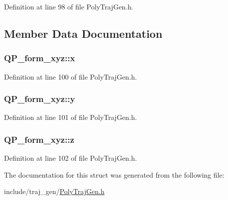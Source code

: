 Definition at line 98 of file Poly\+Traj\+Gen.\+h.



\subsection{Member Data Documentation}
\subsubsection[{\texorpdfstring{x}{x}}]{ Q\+P\+\_\+form\+\_\+xyz\+::x}\hypertarget{struct_q_p__form__xyz_a3a6e7a104ef31fda66007013ba3741f8}{}\label{struct_q_p__form__xyz_a3a6e7a104ef31fda66007013ba3741f8}


Definition at line 100 of file Poly\+Traj\+Gen.\+h.

\subsubsection[{\texorpdfstring{y}{y}}]{ Q\+P\+\_\+form\+\_\+xyz\+::y}\hypertarget{struct_q_p__form__xyz_a3e1c8fbfd5a4650fb45fc0ca14c2bcb6}{}\label{struct_q_p__form__xyz_a3e1c8fbfd5a4650fb45fc0ca14c2bcb6}


Definition at line 101 of file Poly\+Traj\+Gen.\+h.

\subsubsection[{\texorpdfstring{z}{z}}]{ Q\+P\+\_\+form\+\_\+xyz\+::z}\hypertarget{struct_q_p__form__xyz_a243478dd3ac49ecf0d6fceffbcdf408b}{}\label{struct_q_p__form__xyz_a243478dd3ac49ecf0d6fceffbcdf408b}


Definition at line 102 of file Poly\+Traj\+Gen.\+h.



The documentation for this struct was generated from the following file\+:\begin{DoxyCompactItemize}
\item 
include/traj\+\_\+gen/\hyperlink{_poly_traj_gen_8h}{Poly\+Traj\+Gen.\+h}\end{DoxyCompactItemize}
